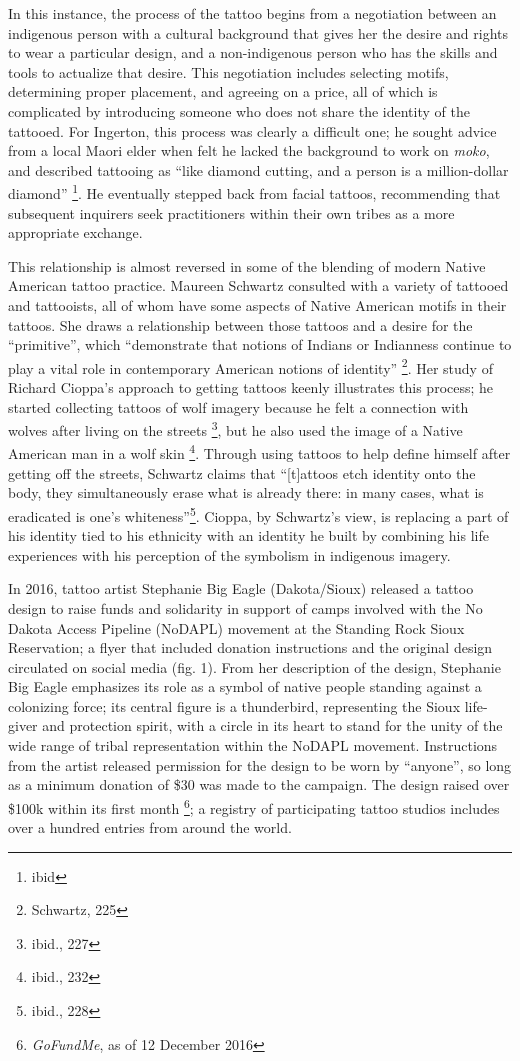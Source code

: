 In this instance, the process of the tattoo begins from a negotiation between an
indigenous person with a cultural background that gives her the desire and
rights to wear a particular design, and a non-indigenous person who has the
skills and tools to actualize that desire. This negotiation includes selecting
motifs, determining proper placement, and agreeing on a price, all of which is
complicated by introducing someone who does not share the identity of the
tattooed. For Ingerton, this process was clearly a difficult one; he sought
advice from a local Maori elder when felt he lacked the background to
work on \textit{moko}, and described tattooing as ``like diamond cutting, and a
person is a million-dollar diamond'' \footnote{ibid}. He eventually stepped back
from facial tattoos, recommending that subsequent inquirers seek
practitioners within their own tribes as a more appropriate exchange.

This relationship is almost reversed in some of the blending of modern Native American
tattoo practice. Maureen Schwartz consulted with a variety of tattooed and
tattooists, all of whom have some aspects of Native American motifs in their
tattoos. She draws a relationship between those tattoos and a desire for the
``primitive'', which ``demonstrate that notions of Indians or Indianness
continue to play a vital role in contemporary American notions of identity''
\footnote{Schwartz, 225}. Her study of Richard Cioppa's approach to getting
tattoos keenly illustrates this process; he started collecting tattoos of wolf
imagery because he felt a connection with wolves after living on the streets
\footnote{ibid., 227}, but he also used the image of a Native American man in a
wolf skin \footnote{ibid., 232}. Through using tattoos to help define himself
after getting off the streets, Schwartz claims that ``[t]attoos etch identity
onto the body, they simultaneously erase what is already there: in many cases,
what is eradicated is one's whiteness''\footnote{ibid., 228}. Cioppa, by
Schwartz's view, is replacing a part of his identity tied to his
ethnicity with an identity he built by combining his life experiences with his
perception of the symbolism in indigenous imagery.

In 2016, tattoo artist Stephanie Big Eagle (Dakota/Sioux) released a tattoo
design to raise funds and solidarity in support of camps involved with the No
Dakota Access Pipeline (NoDAPL) movement at the Standing Rock Sioux Reservation;
a flyer that included donation instructions and the original design circulated
on social media (fig.  1). From her description of the design, Stephanie Big
Eagle emphasizes its role as a symbol of native people standing against a
colonizing force; its central figure is a thunderbird, representing the Sioux
life-giver and protection spirit, with a circle in its heart to stand for the
unity of the wide range of tribal representation within the NoDAPL movement.
Instructions from the artist released permission for the design to be worn by
``anyone'', so long as a minimum donation of \$30 was made to the campaign.
The design raised over \$100k within its first month
\footnote{\textit{GoFundMe}, as of 12 December 2016}; a registry of
participating tattoo studios includes over a hundred entries from around the world.

